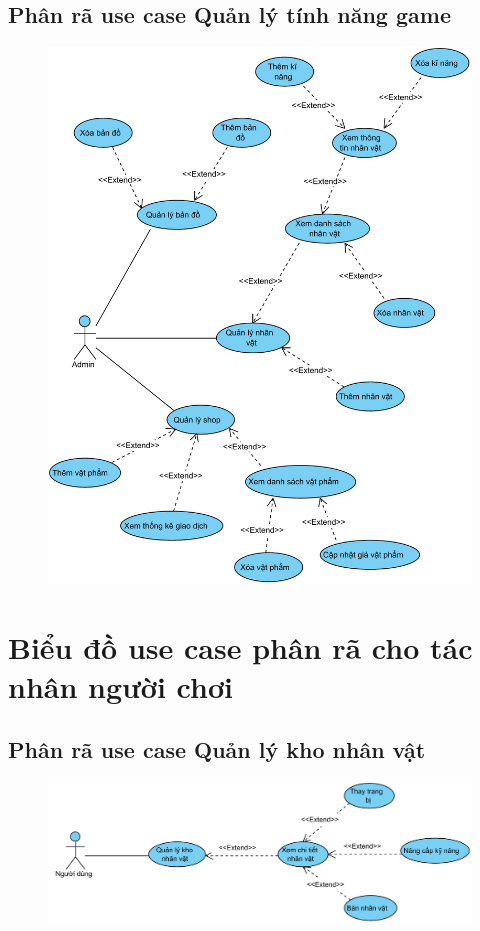 \documentclass[3p]{elsarticle}
\begin{document}
\subsection{Phân rã use case Quản lý tính năng game}
\begin{figure}[!htbp]
	\hspace*{-.5in}
	\centering
	\includegraphics[scale=.7]{images/usecases/admin_GameManagement.pdf}
\end{figure}
\newpage
\section{Biểu đồ use case phân rã cho tác nhân người chơi}
\subsection{Phân rã use case Quản lý kho nhân vật}
\begin{figure}[!htbp]
	\hspace*{-.5in}
	\centering
	\includegraphics[scale=.7]{images/usecases/gamer_CharacterManagement.pdf}
\end{figure}
\end{document}
